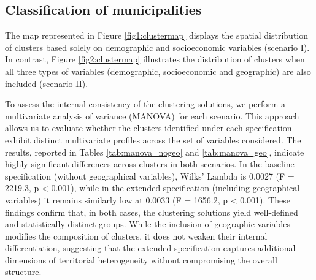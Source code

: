 \documentclass[a4paper,11pt,oneside]{article}
\begin{document}
\subsection{Classification of municipalities}


The map represented in Figure \ref{fig1:clustermap} displays the spatial distribution of clusters based solely on demographic and socioeconomic variables  (scenario I). In contrast, Figure \ref{fig2:clustermap} illustrates the distribution of clusters when all three types of variables (demographic, socioeconomic and geographic) are also included  (scenario II).



To assess the internal consistency of the clustering solutions, we perform a multivariate analysis of variance (MANOVA) for each scenario. This approach allows us to evaluate whether the clusters identified under each specification exhibit distinct multivariate profiles across the set of variables considered. The results, reported in Tables \ref{tab:manova_nogeo} and \ref{tab:manova_geo}, indicate highly significant differences across clusters in both scenarios. In the baseline specification (without geographical variables), Wilks’ Lambda is 0.0027 (F = 2219.3, p < 0.001), while in the extended specification (including geographical variables) it remains similarly low at 0.0033 (F = 1656.2, p < 0.001). These findings confirm that, in both cases, the clustering solutions yield well-defined and statistically distinct groups. While the inclusion of geographic variables modifies the composition of clusters, it does not weaken their internal differentiation, suggesting that the extended specification captures additional dimensions of territorial heterogeneity without compromising the overall structure.
\end{document}
